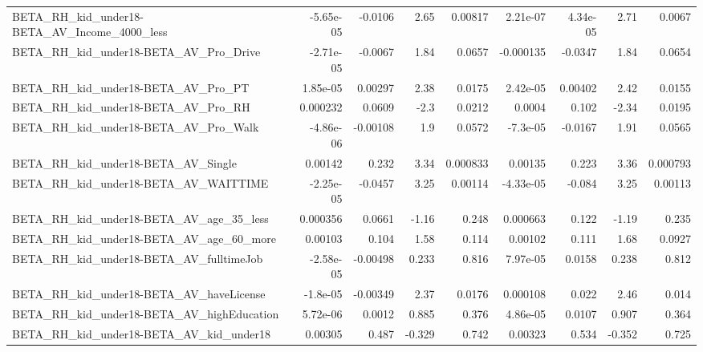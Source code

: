 \begin{tabular}{lrrrrrrrr}
BETA\_RH\_kid\_under18-BETA\_AV\_Income\_4000\_less       &   -5.65e-05 &      -0.0106 &      2.65 &  0.00817 &   2.21e-07 &    4.34e-05 &         2.71 &        0.0067 \\
BETA\_RH\_kid\_under18-BETA\_AV\_Pro\_Drive              &   -2.71e-05 &      -0.0067 &      1.84 &   0.0657 &  -0.000135 &     -0.0347 &         1.84 &        0.0654 \\
BETA\_RH\_kid\_under18-BETA\_AV\_Pro\_PT                 &    1.85e-05 &      0.00297 &      2.38 &   0.0175 &   2.42e-05 &     0.00402 &         2.42 &        0.0155 \\
BETA\_RH\_kid\_under18-BETA\_AV\_Pro\_RH                 &    0.000232 &       0.0609 &      -2.3 &   0.0212 &     0.0004 &       0.102 &        -2.34 &        0.0195 \\
BETA\_RH\_kid\_under18-BETA\_AV\_Pro\_Walk               &   -4.86e-06 &     -0.00108 &       1.9 &   0.0572 &   -7.3e-05 &     -0.0167 &         1.91 &        0.0565 \\
BETA\_RH\_kid\_under18-BETA\_AV\_Single                 &     0.00142 &        0.232 &      3.34 & 0.000833 &    0.00135 &       0.223 &         3.36 &      0.000793 \\
BETA\_RH\_kid\_under18-BETA\_AV\_WAITTIME               &   -2.25e-05 &      -0.0457 &      3.25 &  0.00114 &  -4.33e-05 &      -0.084 &         3.25 &       0.00113 \\
BETA\_RH\_kid\_under18-BETA\_AV\_age\_35\_less            &    0.000356 &       0.0661 &     -1.16 &    0.248 &   0.000663 &       0.122 &        -1.19 &         0.235 \\
BETA\_RH\_kid\_under18-BETA\_AV\_age\_60\_more            &     0.00103 &        0.104 &      1.58 &    0.114 &    0.00102 &       0.111 &         1.68 &        0.0927 \\
BETA\_RH\_kid\_under18-BETA\_AV\_fulltimeJob            &   -2.58e-05 &     -0.00498 &     0.233 &    0.816 &   7.97e-05 &      0.0158 &        0.238 &         0.812 \\
BETA\_RH\_kid\_under18-BETA\_AV\_haveLicense            &    -1.8e-05 &     -0.00349 &      2.37 &   0.0176 &   0.000108 &       0.022 &         2.46 &         0.014 \\
BETA\_RH\_kid\_under18-BETA\_AV\_highEducation          &    5.72e-06 &       0.0012 &     0.885 &    0.376 &   4.86e-05 &      0.0107 &        0.907 &         0.364 \\
BETA\_RH\_kid\_under18-BETA\_AV\_kid\_under18            &     0.00305 &        0.487 &    -0.329 &    0.742 &    0.00323 &       0.534 &       -0.352 &         0.725 \\

\end{tabular}
